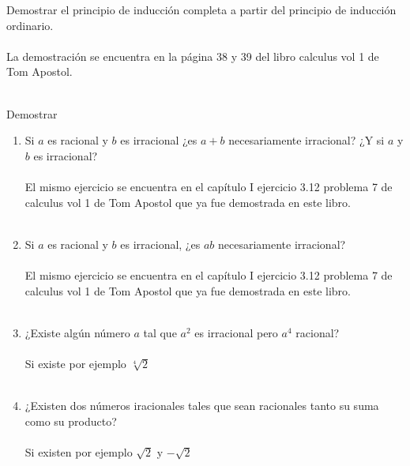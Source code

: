 \begin{teo}
Demostrar el principio de inducción completa a partir del principio de inducción ordinario.\\\\
La demostración se encuentra en la página 38 y 39 del libro calculus vol 1 de Tom Apostol.\\\\
\end{teo}

\begin{teo}Demostrar
\begin{enumerate}[\bfseries a)]
\item Si $a$ es racional y \; $b$ es irracional ¿es $a+b$ necesariamente irracional? ¿Y si $a$ \; y \; $b$ es irracional? \\\\
El mismo ejercicio se encuentra en el capítulo I ejercicio 3.12 problema 7 de calculus vol 1 de Tom Apostol que ya fue demostrada en este libro.\\\\

\item Si $a$ es racional y \; $b$ es irracional, ¿es $ab$ necesariamente irracional?\\\\
El mismo ejercicio se encuentra en el capítulo I ejercicio 3.12 problema 7 de calculus vol 1 de Tom Apostol que ya fue demostrada en este libro.\\\\

\item ¿Existe algún número $a$ tal que $a^2$ es irracional pero $a^4$ racional?\\\\
Si existe por ejemplo $\sqrt[4]{2}$\\\\

\item ¿Existen dos números iracionales tales que sean racionales tanto su suma como su producto?\\\\
Si existen por ejemplo $\sqrt{2}$ y $- \sqrt{2}$\\\\
\end{enumerate}
\end{teo}


